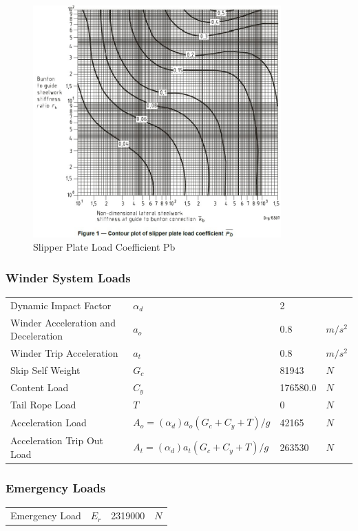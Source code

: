 \documentclass{article}%
\begin{document}
\begin{figure}[h!]%
\includegraphics[width=360px]{plate_load_coef.jpg}%
\centering%
\caption{Slipper Plate Load Coefficient Pb}%
\centering%
\end{figure}

%
\subsubsection{Winder System Loads}%
\label{ssubsec:WinderSystemLoads}%
\begin{flushleft}%
\begin{minipage}{\textwidth}%
\flushleft%
\begin{tabular}{l l l l}%
Dynamic Impact Factor&$\alpha_d$&2&\\%
Winder Acceleration and Deceleration&$a_o$&0.8&$m/s^2$\\%
Winder Trip Acceleration&$a_t$&0.8&$m/s^2$\\%
Skip Self Weight&$G_c$&81943&$N$\\%
Content Load&$C_y$&176580.0&$N$\\%
Tail Rope Load&$T$&0&$N$\\%
Acceleration Load&$A_o = (\alpha_d) a_o (G_c + C_y + T)/g$&42165&$N$\\%
Acceleration Trip Out Load&$A_t = (\alpha_d) a_t (G_c + C_y + T)/g$&263530&$N$\\%
\end{tabular}%
\end{minipage}%
\end{flushleft}

%
\subsubsection{Emergency Loads}%
\label{ssubsec:EmergencyLoads}%
\begin{flushleft}%
\begin{minipage}{\textwidth}%
\flushleft%
\begin{tabular}{l l l l}%
Emergency Load&$E_r$&2319000&$N$\\%
\end{tabular}%
\end{minipage}%
\end{flushleft}
\end{document}
